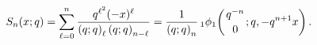 \[\mathop{S_{n}\/}\nolimits\!\left(x;q\right)=\sum_{\ell=0}^{n}\frac{q^{\ell^{2}%
}(-x)^{\ell}}{\left(q;q\right)_{\ell}\left(q;q\right)_{n-\ell}}=\frac{1}{\left%
(q;q\right)_{n}}\mathop{{{}_{1}\phi_{1}}\/}\nolimits\!\left({q^{-n}\atop 0};q,%
-q^{n+1}x\right).\]